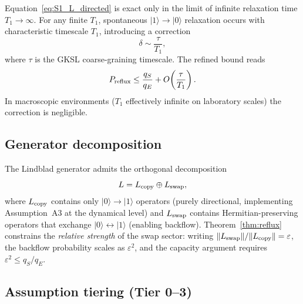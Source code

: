 \documentclass[aps,prd,twocolumn,superscriptaddress,nofootinbib,floatfix]{revtex4-2}
\begin{document}
Equation~\eqref{eq:S1_L_directed} is exact only in the limit of infinite
relaxation time $T_1\to\infty$.  For any finite $T_1$, spontaneous
$|1\rangle\to|0\rangle$ relaxation occurs with characteristic timescale
$T_1$, introducing a correction
\begin{equation}
  \delta \sim \frac{\tau}{T_1},
  \label{eq:S1_delta}
\end{equation}
where $\tau$ is the GKSL coarse-graining timescale.  The refined bound reads
\begin{equation}
  P_{\rm reflux} \le \frac{q_S}{q_E} + O\!\left(\frac{\tau}{T_1}\right).
  \label{eq:S1_refined}
\end{equation}
In macroscopic environments ($T_1$ effectively infinite on laboratory
scales) the correction is negligible.

\subsection{Generator decomposition}

The Lindblad generator admits the orthogonal decomposition
\begin{equation}
  L = L_{\rm copy} \oplus L_{\rm swap},
  \label{eq:S1_decomp}
\end{equation}
where $L_{\rm copy}$ contains only $|0\rangle\!\to\!|1\rangle$ operators
(purely directional, implementing Assumption~A3 at the dynamical level) and
$L_{\rm swap}$ contains Hermitian-preserving operators that exchange
$|0\rangle\leftrightarrow|1\rangle$ (enabling backflow).  Theorem~\ref{thm:reflux}
constrains the \emph{relative strength} of the swap sector: writing
$\|L_{\rm swap}\|/\|L_{\rm copy}\| = \varepsilon$, the backflow probability
scales as $\varepsilon^2$, and the capacity argument requires
$\varepsilon^2 \le q_S/q_E$.

\subsection{Assumption tiering (Tier 0--3)}
\end{document}
